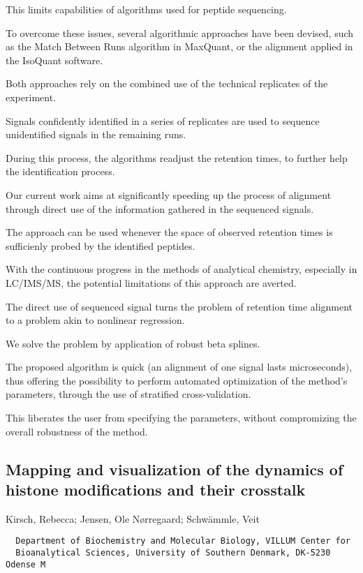{This limits capabilities of algorithms used for peptide sequencing.

To overcome these issues, several algorithmic approaches have been devised, such as the Match Between Runs algorithm in MaxQuant, or the alignment applied in the IsoQuant software.

Both approaches rely on the combined use of the technical replicates of the experiment.

Signals confidently identified in a series of replicates are used to sequence unidentified signals in the remaining runs.

During this process, the algorithms readjust the retention times, to further help the identification process.

Our current work aims at significantly speeding up the process of alignment through direct use of the information gathered in the sequenced signals.

The approach can be used whenever the space of observed retention times is sufficienly probed by the identified peptides.

With the continuous progress in the methods of analytical chemistry, especially in LC/IMS/MS, the potential limitations of this approach are averted.

The direct use of sequenced signal turns the problem of retention time alignment to a problem akin to nonlinear regression.

We solve the problem by application of robust beta splines.

The proposed algorithm is quick (an alignment of one signal lasts microseconds), thus offering the possibility to perform automated optimization of the method's parameters, through the use of stratified cross-validation.

This liberates the user from specifying the parameters, without compromizing the overall robustness of the method.


\subsection*{\color{eubicRed} Mapping and visualization of the dynamics of histone modifications and their crosstalk}
{\color{eubicGray}Kirsch, Rebecca;
Jensen, Ole Nørregaard;
Schwämmle, Veit}
{\color{eubicGray}\begin{verbatim}
  Department of Biochemistry and Molecular Biology, VILLUM Center for
  Bioanalytical Sciences, University of Southern Denmark, DK-5230 Odense M
\end{verbatim}}

}
